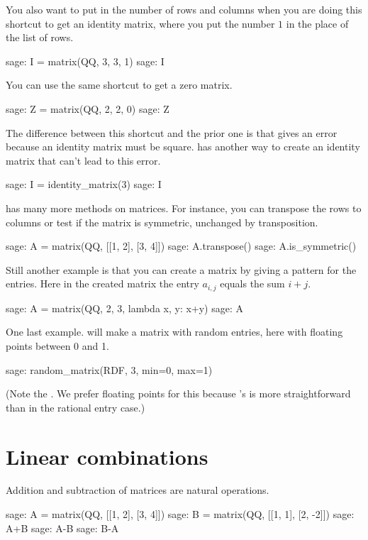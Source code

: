 You also want to put in the
number of rows and columns when you are doing 
this shortcut to get an identity matrix, where you
put the number $1$ in the place of the list of rows.
\begin{sagecommandline}
sage: I = matrix(QQ, 3, 3, 1)                     
sage: I
\end{sagecommandline}
You can use the same
shortcut to get a zero matrix.
\begin{sagecommandline}
sage: Z = matrix(QQ, 2, 2, 0)
sage: Z
\end{sagecommandline}
The difference between this shortcut and the prior one is that 
 gives an error because 
an identity matrix must be square.
\Sage{} has another way to create an identity matrix 
that can't lead to this error.
\begin{sagecommandline}
sage: I = identity_matrix(3)
sage: I
\end{sagecommandline}

\Sage{} has many more methods on matrices.
For instance, you can transpose the rows to columns or test if the 
matrix is symmetric,
unchanged by transposition.
\begin{sagecommandline}
sage: A = matrix(QQ, [[1, 2], [3, 4]])
sage: A.transpose()
sage: A.is_symmetric()
\end{sagecommandline}
Still another example is that you can create a matrix by giving a pattern
for the entries.
Here in the created matrix the entry $a_{i,j}$ equals the sum
$i+j$.
\begin{sagecommandline}
sage: A = matrix(QQ, 2, 3, lambda x, y: x+y)
sage: A
\end{sagecommandline}
One last example.
\Sage{} will make a matrix with random entries, here
with floating points between 0 and 1.
\begin{sagecommandline}
sage: random_matrix(RDF, 3, min=0, max=1)
\end{sagecommandline}
(Note the .
We prefer floating points for this because
\Sage's  
is more straightforward than in the  
rational entry case.)




\section{Linear combinations}
Addition and subtraction of matrices are natural operations.
\begin{sagecommandline}
sage: A = matrix(QQ, [[1, 2], [3, 4]])
sage: B = matrix(QQ, [[1, 1], [2, -2]])
sage: A+B
sage: A-B
sage: B-A
\end{sagecommandline}

